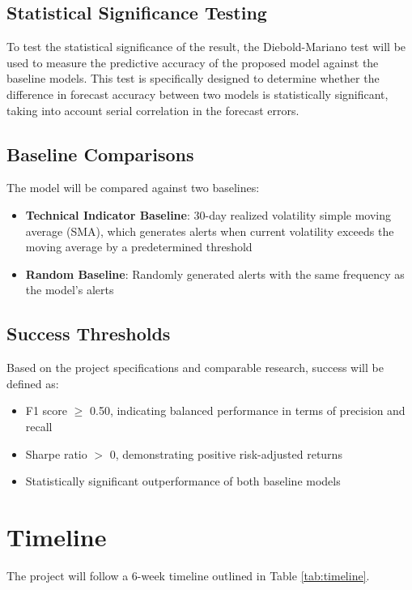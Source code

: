 \documentclass[11pt,twocolumn]{article}
\begin{document}
\subsection{\textbf{Statistical Significance Testing}}
To test the statistical significance of the result, the Diebold-Mariano test will be used to measure the predictive accuracy of the proposed model against the baseline models. This test is specifically designed to determine whether the difference in forecast accuracy between two models is statistically significant, taking into account serial correlation in the forecast errors.

\subsection{\textbf{Baseline Comparisons}}
The model will be compared against two baselines:
\begin{itemize}
\item \textbf{Technical Indicator Baseline}: 30-day realized volatility simple moving average (SMA), which generates alerts when current volatility exceeds the moving average by a predetermined threshold
\item \textbf{Random Baseline}: Randomly generated alerts with the same frequency as the model's alerts
\end{itemize}

\subsection{\textbf{Success Thresholds}}
Based on the project specifications and comparable research, success will be defined as:
\begin{itemize}
\item F1 score $\geq$ 0.50, indicating balanced performance in terms of precision and recall
\item Sharpe ratio $>$ 0, demonstrating positive risk-adjusted returns
\item Statistically significant outperformance of both baseline models
\end{itemize}

\section{Timeline}
The project will follow a 6-week timeline outlined in Table \ref{tab:timeline}.
\end{document}
